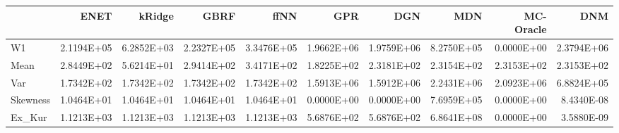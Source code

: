 \begin{tabular}{lrrrrrrrrr}
\toprule
{} &       ENET &     kRidge &       GBRF &       ffNN &        GPR &        DGN &        MDN &  MC-Oracle &        DNM \\
\midrule
W1       & 2.1194E+05 & 6.2852E+03 & 2.2327E+05 & 3.3476E+05 & 1.9662E+06 & 1.9759E+06 & 8.2750E+05 & 0.0000E+00 & 2.3794E+06 \\
Mean     & 2.8449E+02 & 5.6214E+01 & 2.9414E+02 & 3.4171E+02 & 1.8225E+02 & 2.3181E+02 & 2.3154E+02 & 2.3153E+02 & 2.3153E+02 \\
Var      & 1.7342E+02 & 1.7342E+02 & 1.7342E+02 & 1.7342E+02 & 1.5913E+06 & 1.5912E+06 & 2.2431E+06 & 2.0923E+06 & 6.8824E+05 \\
Skewness & 1.0464E+01 & 1.0464E+01 & 1.0464E+01 & 1.0464E+01 & 0.0000E+00 & 0.0000E+00 & 7.6959E+05 & 0.0000E+00 & 8.4340E-08 \\
Ex\_Kur   & 1.1213E+03 & 1.1213E+03 & 1.1213E+03 & 1.1213E+03 & 5.6876E+02 & 5.6876E+02 & 6.8641E+08 & 0.0000E+00 & 3.5880E-09 \\
\bottomrule
\end{tabular}
